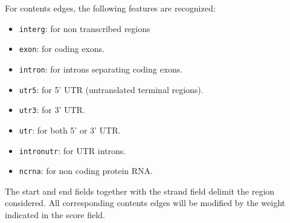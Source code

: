 For contents edges, the following features are recognized:
\begin{itemize}
\item \texttt{interg}: for non transcribed regions
\item \texttt{exon}: for coding exons.
\item \texttt{intron}: for introns separating coding exons.
\item \texttt{utr5}: for 5' UTR (untranslated terminal regions).
\item \texttt{utr3}: for 3' UTR.
\item \texttt{utr}: for both 5' or 3' UTR.
\item \texttt{intronutr}: for UTR introns.
\item \texttt{ncrna}: for non coding protein RNA.
\end{itemize}
The start and end fields together with the strand field delimit the
region considered. All corresponding contents edges will be modified
by the weight indicated in the score field.



